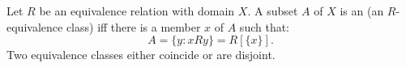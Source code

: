 Let $R$ be an equivalence relation with domain $X$. A subset $A$ of $X$ is an  (an $R$-equivalence class) iff there is a member $x$ of $A$ such that:
$$
A = \{y : xRy\} = R[\{x\}].
$$
Two equivalence classes either coincide or are disjoint.
